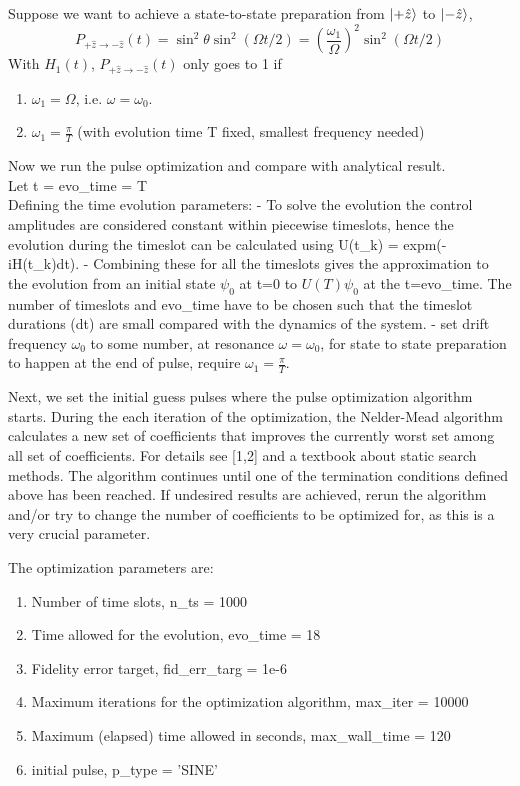 \documentclass[12pt]{report}
\begin{document}
Suppose we want to achieve a state-to-state preparation from $\ket{+\hat{z}}$ to $\ket{-\hat{z}}$,  
$$
P_{+\hat{z} \rightarrow-\hat{z}}(t) = \sin ^2 \theta \sin ^2(\Omega t / 2)=\left(\frac{\omega_1}{\Omega}\right)^2 \sin ^2(\Omega t / 2)
$$
With $H_1(t)$, $P_{+\hat{z} \rightarrow-\hat{z}}(t)$ only goes to 1 if 
\begin{enumerate}
    \item $\omega_1 = \Omega$, i.e. $\omega = \omega_0$.
    \item $\omega_1 = \frac{\pi}{T}$ (with evolution time T fixed, smallest frequency needed)
\end{enumerate}
Now we run the pulse optimization and compare with analytical result.
\\
Let t = evo\_time = T
\\
Defining the time evolution parameters:
- To solve the evolution the control amplitudes are considered constant within piecewise timeslots, hence the evolution during the timeslot can be calculated using U(t\_k) = expm(-iH(t\_k)dt). 
- Combining these for all the timeslots gives the approximation to the evolution from an initial state $\psi_0$ at t=0 to $U(T)\psi_0$ at the t=evo\_time. The number of timeslots and evo\_time have to be chosen such that the timeslot durations (dt) are small compared with the dynamics of the system.
- set drift frequency $\omega_0$ to some number, at resonance $\omega = \omega_0$, for state to state preparation to happen at the end of pulse, require $\omega_1 = \frac{\pi}{T}$.
\par
Next, we set the initial guess pulses where the pulse optimization algorithm starts. 
During the each iteration of the optimization, the Nelder-Mead algorithm calculates a new set of coefficients that improves the currently worst set among all set of coefficients. For details see [1,2] and a textbook about static search methods. 
The algorithm continues until one of the termination conditions defined above has been reached. If undesired results are achieved, rerun the algorithm and/or try to change the number of coefficients to be optimized for, as this is a very crucial parameter.  

The optimization parameters are: 
\begin{enumerate}
    \item Number of time slots, n\_ts = 1000
    \item Time allowed for the evolution, evo\_time = 18
    \item Fidelity error target, fid\_err\_targ = 1e-6
    \item Maximum iterations for the optimization algorithm, max\_iter = 10000
    \item Maximum (elapsed) time allowed in seconds, max\_wall\_time = 120
    \item initial pulse, p\_type = 'SINE'
\end{enumerate}
\end{document}
